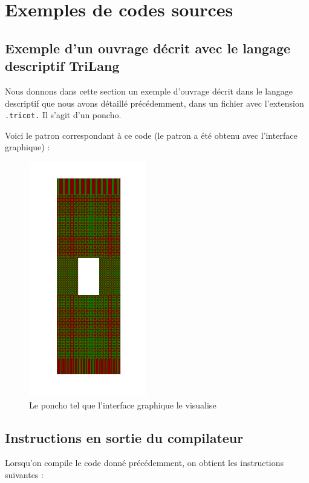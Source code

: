 \documentclass{article}
\begin{document}
\appendix

\section{Exemples de codes sources}

\subsection{Exemple d'un ouvrage décrit avec le langage descriptif TriLang}

Nous donnons dans cette section un exemple d'ouvrage décrit dans le langage descriptif que nous avons détaillé précédemment, dans un fichier avec l'extension \texttt{.tricot.} Il s'agit d'un poncho.



Voici le patron correspondant à ce code (le patron a été obtenu avec l'interface graphique) :

\begin{figure}[!ht]
  \centering \includegraphics[scale=1]{ponzo.png}
  \caption{Le poncho tel que l'interface graphique le visualise}
  \label{ponzo}
\end{figure}

\subsection{Instructions en sortie du compilateur}

Lorsqu'on compile le code donné précédemment, on obtient les instructions suivantes :\\
\end{document}
